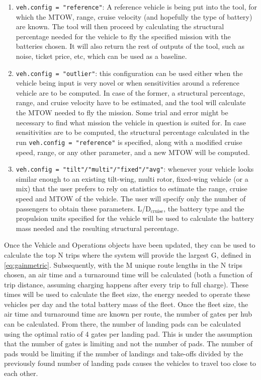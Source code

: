 \begin{enumerate}
    \item \texttt{veh.config = "reference"}: A reference vehicle is being put into the tool, for which the MTOW, range, cruise velocity (and hopefully the type of battery) are known. The tool will then proceed by calculating the structural percentage needed for the vehicle to fly the specified mission with the batteries chosen. It will also return the rest of outputs of the tool, such as noise, ticket price, etc, which can be used as a baseline.
    \item \texttt{veh.config = "outlier"}: this configuration can be used either when the vehicle being input is very novel or when sensitivities around a reference vehicle are to be computed. In case of the former, a structural percentage, range, and cruise velocity have to be estimated, and the tool will calculate the MTOW needed to fly the mission. Some trial and error might be necessary to find what mission the vehicle in question is suited for. In case sensitivities are to be computed, the structural percentage calculated in the run \texttt{veh.config = "reference"} is specified, along with a modified cruise speed, range, or any other parameter, and a new MTOW will be computed.
    \item \texttt{veh.config = "tilt"/"multi"/"fixed"/"avg"}: whenever your vehicle looks similar enough to an existing tilt-wing, multi rotor, fixed-wing vehicle (or a mix) that the user prefers to rely on statistics to estimate the range, cruise speed and MTOW of the vehicle. The user will specify only the number of passengers to obtain these parameters. L/D$_{\text{cruise}}$, the battery type and the propulsion units specified for the vehicle will be used to calculate the battery mass needed and the resulting structural percentage.
    
\end{enumerate}


Once the Vehicle and Operations objects have been updated, they can be used to calculate the top N trips where the  system will provide the largest G, defined in \autoref{eq:gainmetric}. Subsequently, with the M unique route lengths in the N trips chosen, an air time and a turnaround time will be calculated (both a function of trip distance, assuming charging happens after every trip to full charge). These times will be used to calculate the fleet size, the energy needed to operate these vehicles per day and the total battery mass of the fleet. Once the fleet size, the air time and turnaround time are known per route, the number of gates per hub can be calculated. From there, the number of landing pads can be calculated using the optimal ratio of 4 gates per landing pad. This is under the assumption that the number of gates is limiting and not the number of pads. The number of pads would be limiting if the number of landings and take-offs divided by the previously found number of landing pads causes the vehicles to travel too close to each other.

